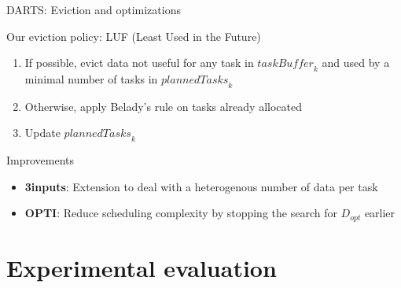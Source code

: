\documentclass{libs/ufc_format}
\newcommand{\threeinputs}{\textbf{3inputs}\xspace}
\newcommand{\OPTI}{\textbf{OPTI}\xspace}
\newcommand{\GPU}[1]{\ensuremath{\mathrm{GPU}_{#1}}\xspace}
\newcommand{\plannedTasks}[1]{\ensuremath{\mathit{plannedTasks}_{#1}}\xspace}
\newcommand{\pulledTasks}[1]{\ensuremath{\mathit{taskBuffer}_{#1}}\xspace}
\begin{document}
\begin{frame}{DARTS: Eviction and optimizations}
	\begin{alertblock}{Our eviction policy: LUF (Least Used in the Future)}
		\begin{enumerate}
			\item If possible, evict data not useful for any task in $\pulledTasks{k}$ and used by a minimal number of tasks in $\plannedTasks{k}$
			\item Otherwise, apply Belady's rule on tasks already allocated
			\item Update $\plannedTasks{k}$
		\end{enumerate}
	\end{alertblock}
	\begin{alertblock}{Improvements}
		\begin{itemize}
			\item \threeinputs: Extension to deal with a heterogenous number of data per task
			\item \OPTI: Reduce scheduling complexity by stopping the search for $D_{opt}$ earlier
		\end{itemize}
	\end{alertblock}
\end{frame}

\section{Experimental evaluation}
\end{document}
